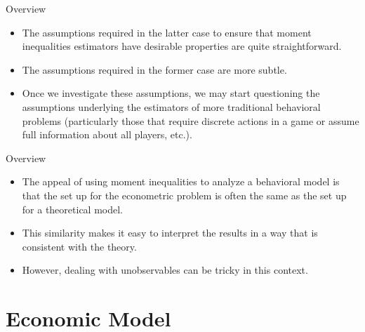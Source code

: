 
\begin{frame}{Overview}
\begin{itemize}
\item The assumptions required in the latter case to ensure that moment
inequalities estimators have desirable properties are quite straightforward.
\vspace{0.1in}
\item The assumptions required in the former case are more subtle. 
\vspace{0.1in}
\item Once we investigate these assumptions, we may start questioning the assumptions underlying the estimators of more traditional behavioral problems (particularly those that require discrete actions in a game or assume full information about all players, etc.).
\end{itemize}
\end{frame}

\begin{frame}{Overview}
\begin{itemize}
\item The appeal of using moment inequalities to analyze a behavioral model is
that the set up for the econometric problem is often the same as the set up for a
theoretical model.
\vspace{0.1in}
\item This similarity makes it easy to interpret the results in a way that
is consistent with the theory.
\vspace{0.1in}
\item However, dealing with unobservables can be tricky in this context.
\end{itemize}
\end{frame}

\section{Economic Model}

